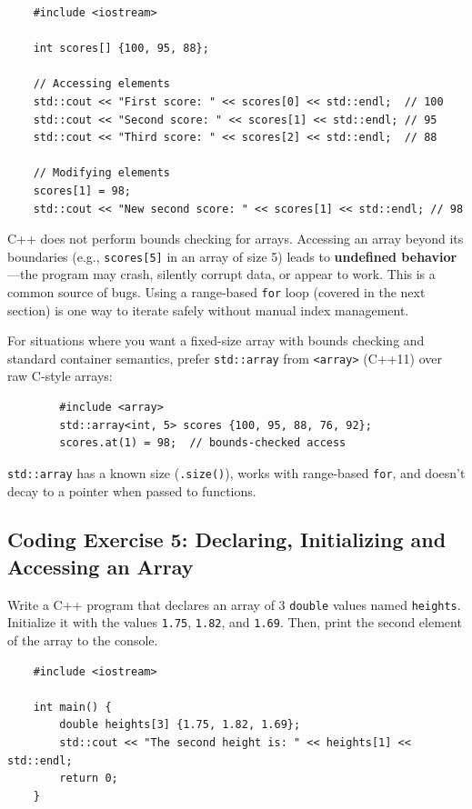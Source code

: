 \begin{lstlisting}
	#include <iostream>

	int scores[] {100, 95, 88};

	// Accessing elements
	std::cout << "First score: " << scores[0] << std::endl;  // 100
	std::cout << "Second score: " << scores[1] << std::endl; // 95
	std::cout << "Third score: " << scores[2] << std::endl;  // 88

	// Modifying elements
	scores[1] = 98;
	std::cout << "New second score: " << scores[1] << std::endl; // 98
\end{lstlisting}

\begin{remark}
	C++ does not perform bounds checking for arrays. Accessing an array beyond its boundaries (e.g., \texttt{scores[5]} in an array of size 5) leads to \textbf{undefined behavior}—the program may crash, silently corrupt data, or appear to work. This is a common source of bugs. Using a range-based \texttt{for} loop (covered in the next section) is one way to iterate safely without manual index management.
\end{remark}

\begin{remark}
	For situations where you want a fixed-size array with bounds checking and standard container semantics, prefer \texttt{std::array} from \texttt{<array>} (C++11) over raw C-style arrays:
	\begin{lstlisting}
		#include <array>
		std::array<int, 5> scores {100, 95, 88, 76, 92};
		scores.at(1) = 98;  // bounds-checked access
	\end{lstlisting}
	\texttt{std::array} has a known size (\texttt{.size()}), works with range-based \texttt{for}, and doesn't decay to a pointer when passed to functions.
\end{remark}

\subsection{Coding Exercise 5: Declaring, Initializing and Accessing an Array}
Write a C++ program that declares an array of 3 \texttt{double} values named \texttt{heights}. Initialize it with the values \texttt{1.75}, \texttt{1.82}, and \texttt{1.69}. Then, print the second element of the array to the console.

\begin{lstlisting}
	#include <iostream>

	int main() {
		double heights[3] {1.75, 1.82, 1.69};
		std::cout << "The second height is: " << heights[1] << std::endl;
		return 0;
	}
\end{lstlisting}

